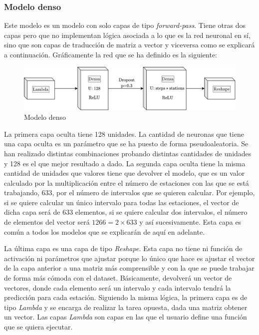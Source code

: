 \subsubsection{Modelo denso}


Este modelo es un modelo con solo capas de tipo \textit{forward-pass}. Tiene otras dos capas pero que no implementan lógica asociada a lo que es la red neuronal en sí, sino que son capas de traducción de matriz a vector y viceversa como se explicará a continuación. Gráficamente la red que se ha definido es la siguiente:
\begin{figure}[H]
    \centering
    \includegraphics[width=12cm]{images/solution/models/dense.png}
    \caption{Modelo denso}
    \label{fig:dense-model}
\end{figure}

La primera capa oculta tiene 128 unidades. La cantidad de neuronas que tiene una capa oculta es un parámetro que se ha puesto de forma pseudoaleatoria. Se han realizado distintas combinaciones probando distintas cantidades de unidades y 128 es el que mejor resultado a dado. La segunda capa oculta tiene la misma cantidad de unidades que valores tiene que devolver el modelo, que es un valor calculado por la multiplicación entre el número de estaciones con las que se está trabajando, 633, por el número de intervalos que se quieren calcular. Por ejemplo, si se quiere calcular un único intervalo para todas las estaciones, el vector de dicha capa será de $633$ elementos, si se quiere calcular dos intervalos, el número de elementos del vector será $1266 = 2 \times 633$ y así sucesivamente. Esta capa es común a todos los modelos que se explicarán de aquí en adelante.
\newline

La última capa es una capa de tipo \textit{Reshape}. Esta capa no tiene ni función de activación ni parámetros que ajustar porque lo único que hace es ajustar el vector de la capa anterior a una matriz más comprensible y con la que se puede trabajar de forma más cómoda con el dataset. Básicamente, devolverá un vector de vectores, donde cada elemento será un intervalo y cada intervalo tendrá la predicción para cada estación. Siguiendo la misma lógica, la primera capa es de tipo \textit{Lambda} y se encarga de realizar la tarea opuesta, dada una matriz obtener un vector. Las capas \textit{Lambda} son capas en las que el usuario define una función que se quiera ejecutar.
\newline

